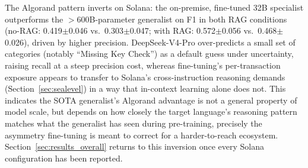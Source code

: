 \documentclass[lettersize,journal]{IEEEtran}
\begin{document}
\begin{table}[t]
\centering
\caption{Impact of RAG on Precision, Recall, and F1-score, Solana, mean $\pm$ std over 5 seeded
samples ($N=5$, 97-contract test set). Values in parentheses are the net gain ($\Delta$) over the
no-RAG condition.}
\label{tab:rag_comparison_full_solana}
\end{table}

The Algorand pattern inverts on Solana: the on-premise, fine-tuned 32B specialist outperforms the
$>$600B-parameter generalist on F1 in both RAG conditions (no-RAG: 0.419$\pm$0.046 vs.\
0.303$\pm$0.047; with RAG: 0.572$\pm$0.056 vs.\ 0.468$\pm$0.026), driven by higher precision.
DeepSeek-V4-Pro over-predicts a small set of categories (notably ``Missing Key Check'') as a default
guess under uncertainty, raising recall at a steep precision cost, whereas fine-tuning's
per-transaction exposure appears to transfer to Solana's cross-instruction reasoning demands
(Section~\ref{sec:sealevel}) in a way that in-context learning alone does not. This indicates the
SOTA generalist's Algorand advantage is not a general property
of model scale, but depends on how closely the target language's reasoning pattern matches what the
generalist has seen during pre-training, precisely the asymmetry fine-tuning is meant to correct
for a harder-to-reach ecosystem. Section~\ref{sec:results_overall} returns to this inversion once
every Solana configuration has been reported.
\end{document}

